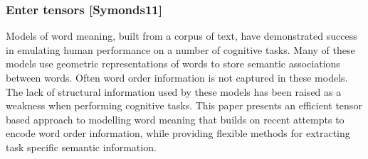 \begin{frame}[plain]
	\frametitle{Enter tensors [Symonds11]}
	\begin{block}{}
    Models of word meaning, built from a corpus of text, have
    demonstrated success in emulating human performance on a number of
    cognitive 
    tasks. Many of these models use geometric representations of words to
    store semantic associations between words. Often word order
    information is not captured in these models. The lack of structural
    information used by these models has been raised as a weakness when
    performing cognitive tasks.
    This paper presents an efficient tensor based approach to modelling
    word meaning that builds on recent attempts to encode word order
    information, while providing flexible methods for extracting task
    specific semantic information.
	\end{block} 
\end{frame}
